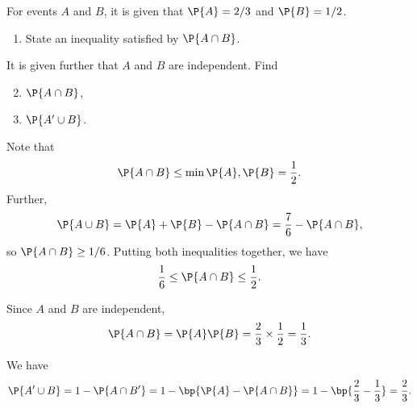 \begin{problem}
    For events $A$ and $B$, it is given that $\P{A} = 2/3$ and $\P{B} = 1/2$.
    
    \begin{enumerate}
        \item State an inequality satisfied by $\P{A \cap B}$.
    \end{enumerate}

    It is given further that $A$ and $B$ are independent. Find
    \begin{enumerate}
        \setcounter{enumi}{1}
        \item $\P{A \cap B}$,
        \item $\P{A' \cup B}$.
    \end{enumerate}
\end{problem}
\begin{solution}
    \begin{ppart}
        Note that \[\P{A \cap B} \leq \min{\P{A}, \P{B}} = \frac12.\] Further, \[\P{A \cup B} = \P{A} + \P{B} - \P{A \cap B} = \frac76 - \P{A \cap B},\] so $\P{A \cap B} \geq 1/6$. Putting both inequalities together, we have \[\frac16 \leq \P{A \cap B} \leq \frac12.\]
    \end{ppart}
    \begin{ppart}
        Since $A$ and $B$ are independent, \[\P{A \cap B} = \P{A} \P{B} = \frac23 \times \frac12 = \frac13.\]
    \end{ppart}
    \begin{ppart}
        We have \[\P{A' \cup B} = 1 - \P{A \cap B'} = 1 - \bp{\P{A} - \P{A \cap B}} = 1 - \bp{\frac23 - \frac13} = \frac23.\]
    \end{ppart}
\end{solution}

